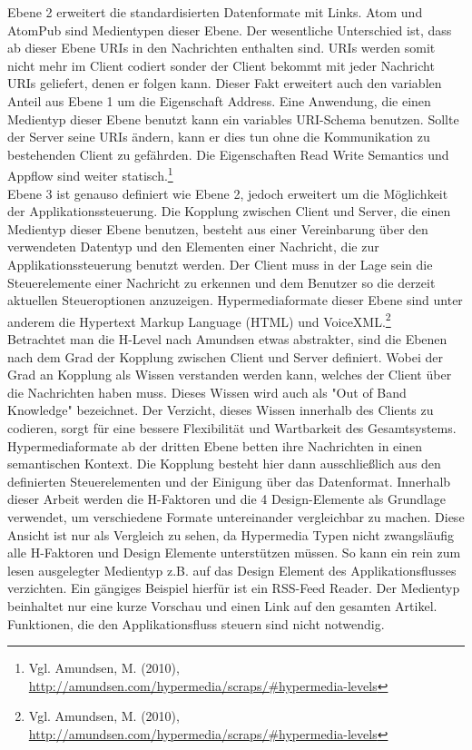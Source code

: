 Ebene 2 erweitert die standardisierten Datenformate mit Links. Atom und AtomPub sind Medientypen dieser Ebene. Der wesentliche Unterschied ist, dass ab dieser Ebene URIs in den Nachrichten enthalten sind. URIs werden somit nicht mehr im Client codiert sonder der Client bekommt mit jeder Nachricht URIs geliefert, denen er folgen kann. Dieser Fakt erweitert auch den variablen Anteil aus Ebene 1 um die Eigenschaft Address. Eine Anwendung, die einen Medientyp dieser Ebene benutzt kann ein variables URI-Schema benutzen. Sollte der Server seine URIs ändern, kann er dies tun ohne die Kommunikation zu bestehenden Client zu gefährden. Die Eigenschaften Read Write Semantics und Appflow sind weiter statisch.\footnote{Vgl. Amundsen, M. (2010), \url{http://amundsen.com/hypermedia/scraps/#hypermedia-levels}}\\
Ebene 3 ist genauso definiert wie Ebene 2, jedoch erweitert um die Möglichkeit der Applikationssteuerung. Die Kopplung zwischen Client und Server, die einen Medientyp dieser Ebene benutzen, besteht aus einer Vereinbarung über den verwendeten Datentyp und den Elementen einer Nachricht, die zur Applikationssteuerung benutzt werden. Der Client muss in der Lage sein die Steuerelemente einer Nachricht zu erkennen und dem Benutzer so die derzeit aktuellen Steueroptionen anzuzeigen. Hypermediaformate dieser Ebene sind unter anderem die Hypertext Markup Language (HTML) und VoiceXML.\footnote{Vgl. Amundsen, M. (2010), \url{http://amundsen.com/hypermedia/scraps/#hypermedia-levels}}\\
Betrachtet man die H-Level nach Amundsen etwas abstrakter, sind die Ebenen nach dem Grad der Kopplung zwischen Client und Server definiert. Wobei der Grad an Kopplung als Wissen verstanden werden kann, welches der Client über die Nachrichten haben muss. Dieses Wissen wird auch als "Out of Band Knowledge" bezeichnet. Der Verzicht, dieses Wissen innerhalb des Clients zu codieren, sorgt für eine bessere Flexibilität und Wartbarkeit des Gesamtsystems. Hypermediaformate ab der dritten Ebene betten ihre Nachrichten in einen semantischen Kontext. Die Kopplung besteht hier dann ausschließlich aus den definierten Steuerelementen und der Einigung über das Datenformat. Innerhalb dieser Arbeit werden die H-Faktoren und die 4 Design-Elemente als Grundlage verwendet, um verschiedene Formate untereinander vergleichbar zu machen. Diese Ansicht ist nur als Vergleich zu sehen, da Hypermedia Typen nicht zwangsläufig alle H-Faktoren und Design Elemente unterstützen müssen. So kann ein rein zum lesen ausgelegter Medientyp z.B. auf das Design Element des Applikationsflusses verzichten. Ein gängiges Beispiel hierfür ist ein RSS-Feed Reader. Der Medientyp beinhaltet nur eine kurze Vorschau und einen Link auf den gesamten Artikel. Funktionen, die den Applikationsfluss steuern sind nicht notwendig.


